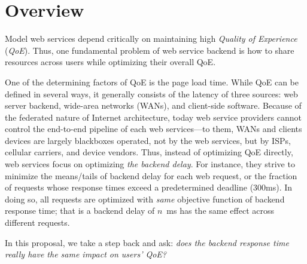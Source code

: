 \section{Overview}

Model web services depend critically on maintaining high {\em Quality of Experience} ({\em QoE}). 
Thus, one fundamental problem of web service backend is how to share resources across users while optimizing their overall QoE. 

One of the determining factors of QoE is the page load time. 
While QoE can be defined in several ways, it generally consists of the latency of three sources: web server backend, wide-area networks (WANs), and client-side software.
Because of the federated nature of Internet architecture, today web service providers cannot control the end-to-end pipeline of each web services---to them, WANs and clients devices are largely blackboxes operated, not by the web services, but by ISPs, cellular carriers, and device vendors.
Thus, instead of optimizing  QoE directly, web services focus on optimizing {\em the backend delay}.
For instance, they strive to minimize the means/tails of backend delay for each web request, or the fraction of requests whose response times exceed a predetermined deadline (\eg 300ms).
In doing so, all requests are optimized with {\em same} objective function of backend response time; that is a backend delay of $n$~ms has the same effect across different requests.

In this proposal, we take a step back and ask: {\em does the backend response time really have the same impact on users' QoE?}

